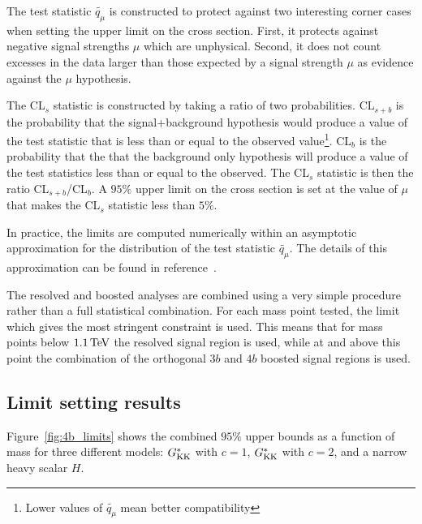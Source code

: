 The test statistic $\widetilde{q_{\mu}}$ is constructed to protect against two interesting corner cases when setting the upper limit on the cross section. First, it protects against negative signal strengths $\mu$ which are unphysical. Second, it does not count excesses in the data larger than those expected by a signal strength $\mu$ as evidence against the $\mu$ hypothesis. 

The CL$_{s}$ statistic is constructed by taking a ratio of two probabilities. CL$_{s+b}$ is the probability that the signal+background hypothesis would produce a value of the test statistic that is less than or equal to the observed value\footnote{Lower values of $\widetilde{q_{\mu}}$ mean better compatibility}. CL$_{b}$ is the probability that the that the background only hypothesis will produce a value of the test statistics less than or equal to the observed. The CL$_{s}$ statistic is then the ratio CL$_{s+b}$/CL$_{b}$. A $95\%$ upper limit on the cross section is set at the value of $\mu$ that makes the CL$_{s}$ statistic less than $5\%$. 

In practice, the limits are computed numerically within an asymptotic approximation for the distribution of the test statistic $\widetilde{q_{\mu}}$. The details of this approximation can be found in reference~\cite{Cowan:2010st}. 

The resolved and boosted analyses are combined using a very simple procedure rather than a full statistical combination. For each mass point tested, the limit which gives the most stringent constraint is used. This means that for mass points below $1.1 \TeV$ the resolved signal region is used, while at and above this point the combination of the orthogonal $3b$ and $4b$ boosted signal regions is used. 

\subsection{Limit setting results}

Figure~\ref{fig:4b_limits} shows the combined $95\%$ upper bounds as a function of mass for three different models: $G^*_{\rm KK}$ with $c=1$, $G^*_{\rm KK}$ with $c=2$, and a narrow heavy scalar $H$. 


